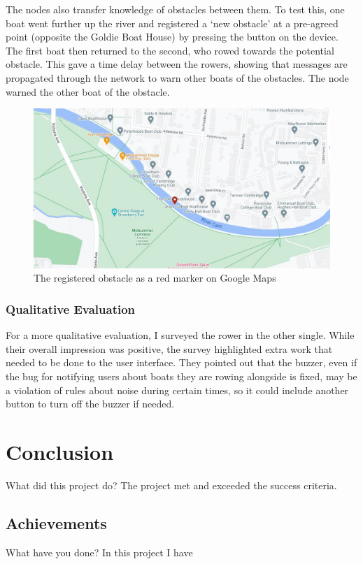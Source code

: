 \documentclass[12pt,a4paper]{report}
\newcommand{\newchapter}[2]{
    \setcounter{chapter}{#1}
    \setcounter{section}{0}
    \chapter*{#2}
    \addcontentsline{toc}{chapter}{#1 #2}
}
\begin{document}
The nodes also transfer knowledge of obstacles between them. To test this, one boat went further up the river and registered a `new obstacle' at a pre-agreed point (opposite the Goldie Boat House) by pressing the button on the device. The first boat then returned to the second, who rowed towards the potential obstacle. This gave a time delay between the rowers, showing that messages are propagated through the network to warn other boats of the obstacles. The node warned the other boat of the obstacle. 
\begin{figure}[h]
\begin{center}
\includegraphics[scale=0.3]{obstacle.jpg}
\end{center}
\caption{The registered obstacle as a red marker on Google Maps \cite{googlemapsgeneral}}
\end{figure}


\subsection{Qualitative Evaluation}
For a more qualitative evaluation, I surveyed the rower in the other single. While their overall impression was positive, the survey highlighted extra work that needed to be done to the user interface. They pointed out that the buzzer, even if the bug for notifying users about boats they are rowing alongside is fixed, may be a violation of rules about noise during certain times, so it could include another button to turn off the buzzer if needed.

\newchapter{5}{Conclusion}
What did this project do? The project met and exceeded the success criteria.

\section{Achievements}
What have you done?
In this project I have 
\end{document}
